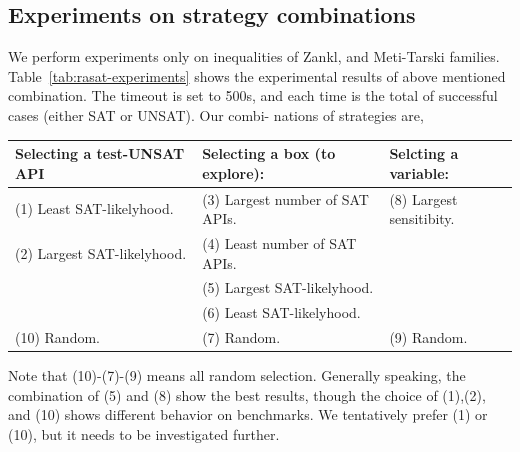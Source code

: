 \documentclass[runningheads,a4paper,oribibl]{llncs}
\begin{document}
\subsection{Experiments on strategy combinations} \label{sec:expstrategy}

We perform experiments only on inequalities of Zankl, and Meti-Tarski families. 
Table~\ref{tab:rasat-experiments} shows the experimental results of above mentioned combination. 
The timeout is set to 500s, and each time is the total of successful cases 
(either SAT or UNSAT). Our combi-
nations of strategies are,

\medskip
{\centering
\begin{tabular}{l|l|l}
Selecting a test-UNSAT API~~ & Selecting a box (to explore): & 
Selcting a variable: \\  %
\hline

(1) Least SAT-likelyhood. & 
(3) Largest number of SAT APIs.~~ & 
(8) Largest sensitibity. \\

(2) Largest SAT-likelyhood. & 
(4) Least number of SAT APIs. & \\

& (5) Largest SAT-likelyhood. & \\

& (6) Least SAT-likelyhood. & \\

(10) Random. & (7) Random. & (9) Random. \\
\end{tabular}
}
\medskip

Note that (10)-(7)-(9) means all random selection. 
Generally speaking, the combination of (5) and (8) show the best results, 
though the choice of (1),(2), and (10) shows different behavior on benchmarks. 
We tentatively prefer (1) or (10), but it needs to be investigated further. 
\end{document}
